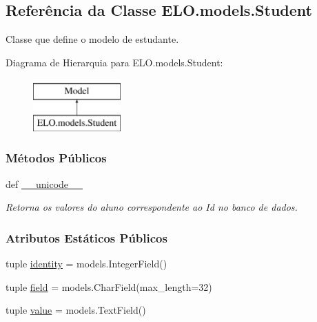 \hypertarget{classELO_1_1models_1_1Student}{\subsection{Referência da Classe E\-L\-O.\-models.\-Student}
\label{classELO_1_1models_1_1Student}
}


Classe que define o modelo de estudante.  


Diagrama de Hierarquia para E\-L\-O.\-models.\-Student\-:\begin{figure}[H]
\begin{center}
\leavevmode
\includegraphics[height=2.000000cm]{d0/dc8/classELO_1_1models_1_1Student}
\end{center}
\end{figure}
\subsubsection*{Métodos Públicos}
\begin{DoxyCompactItemize}
\item 
def \hyperlink{classELO_1_1models_1_1Student_a2f51785c1beb3b45269a8678d97ec783}{\-\_\-\-\_\-unicode\-\_\-\-\_\-}
\begin{DoxyCompactList}\small\item\em Retorna os valores do aluno correspondente ao Id no banco de dados. \end{DoxyCompactList}\end{DoxyCompactItemize}
\subsubsection*{Atributos Estáticos Públicos}
\begin{DoxyCompactItemize}
\item 
tuple \hyperlink{classELO_1_1models_1_1Student_a20a7789a2b0f5b7d0c98453dcf38bc4e}{identity} = models.\-Integer\-Field()
\item 
tuple \hyperlink{classELO_1_1models_1_1Student_a893ec9b2ece5c6b829fce5e5a7c1d576}{field} = models.\-Char\-Field(max\-\_\-length=32)
\item 
tuple \hyperlink{classELO_1_1models_1_1Student_a201226779dce6e064cb16bd92ed016e2}{value} = models.\-Text\-Field()
\end{DoxyCompactItemize}


